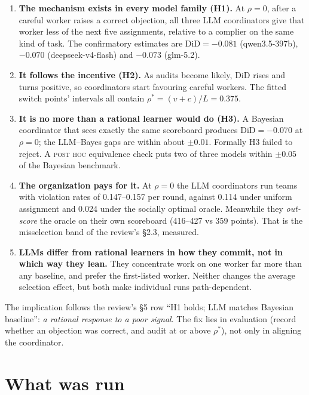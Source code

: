 \documentclass[11pt,a4paper]{article}
\newcommand{\rhostar}{\rho^{*}}
\newcommand{\did}{\mathrm{DiD}}
\newcommand{\posthoc}{\textsc{post hoc}}
\begin{document}
\begin{enumerate}[label=\textbf{\arabic*.}]
  \item \textbf{The mechanism exists in every model family (H1).} At $\rho=0$, after a careful worker raises a correct objection, all three LLM coordinators give that worker less of the next five assignments, relative to a complier on the same kind of task. The confirmatory estimates are $\did=-0.081$ (qwen3.5-397b), $-0.070$ (deepseek-v4-flash) and $-0.073$ (glm-5.2).
  \item \textbf{It follows the incentive (H2).} As audits become likely, $\did$ rises and turns positive, so coordinators start favouring careful workers. The fitted switch points' intervals all contain $\rhostar=(v+c)/L=0.375$.
  \item \textbf{It is no more than a rational learner would do (H3).} A Bayesian coordinator that sees exactly the same scoreboard produces $\did=-0.070$ at $\rho=0$; the LLM--Bayes gaps are within about $\pm0.01$. Formally H3 failed to reject. A \posthoc{} equivalence check puts two of three models within $\pm0.05$ of the Bayesian benchmark.
  \item \textbf{The organization pays for it.} At $\rho=0$ the LLM coordinators run teams with violation rates of 0.147--0.157 per round, against 0.114 under uniform assignment and 0.024 under the socially optimal oracle. Meanwhile they \emph{out-score} the oracle on their own scoreboard (416--427 vs 359 points). That is the misselection band of the review's \S2.3, measured.
  \item \textbf{LLMs differ from rational learners in how they commit, not in which way they lean.} They concentrate work on one worker far more than any baseline, and prefer the first-listed worker. Neither changes the average selection effect, but both make individual runs path-dependent.
\end{enumerate}

\noindent The implication follows the review's \S5 row ``H1 holds; LLM matches Bayesian baseline'': \emph{a rational response to a poor signal}. The fix lies in evaluation (record whether an objection was correct, and audit at or above $\rhostar$), not only in aligning the coordinator.

\section{What was run}
\end{document}
